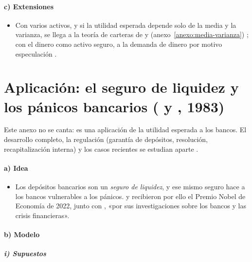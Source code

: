 \documentclass[11pt]{article}
\begin{document}
\paragraph{c) Extensiones}

\begin{itemize}
\item Con varios activos, y si la utilidad esperada depende solo de la media y la varianza, se llega a la teoría de carteras de \textcite{Markowitz1952Portfolio} y \textcite{Tobin1958Liquidity} (anexo~\ref{anexo:media-varianza}) ; con el dinero como activo seguro, a la demanda de dinero por motivo especulación .
\end{itemize}

\section{Aplicación: el seguro de liquidez y los pánicos bancarios\cortetitulo{} ( y , 1983)}\label{anexo:diamond-dybvig}

Este anexo no se canta: es una aplicación de la utilidad esperada a los bancos. El desarrollo completo, la regulación (garantía de depósitos, resolución, recapitalización interna) y los casos recientes se estudian aparte  .

\paragraph{a) Idea}

\begin{itemize}
\item Los depósitos bancarios son un \emph{seguro de liquidez}, y ese mismo seguro hace a los bancos vulnerables a los pánicos\nocite{DiamondDybvig1983Bank}.  y  recibieron por ello el Premio Nobel de Economía de 2022, junto con , «por sus investigaciones sobre los bancos y las crisis financieras»\nocite{Nobel2022Bancos}.
\end{itemize}

\paragraph{b) Modelo}

\subparagraph{i) Supuestos}
\end{document}

